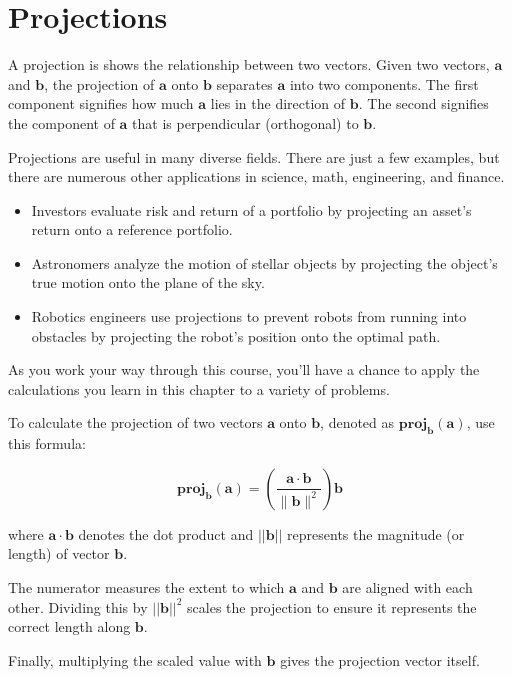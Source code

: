 \chapter{Projections}

A projection is shows the relationship between two vectors. Given two vectors, $\mathbf{a}$ and $\mathbf{b}$, the projection of $\mathbf{a}$ onto $\mathbf{b}$ separates $\mathbf{a}$ into two components. The first component signifies how much $\mathbf{a}$ lies in the direction of $\mathbf{b}$. The second signifies the component of $\mathbf{a}$ that is perpendicular (orthogonal) to $\mathbf{b}$. 

Projections are useful in many diverse fields. There are just a few examples, but there are numerous other applications in science, math, engineering, and finance.

\begin{itemize}
\item Investors evaluate risk and return of a portfolio by projecting an asset’s return onto a reference portfolio.
\item Astronomers analyze the motion of stellar objects by projecting the object’s true motion onto the plane of the sky.
\item Robotics engineers use projections to prevent robots from running into obstacles by projecting the robot’s position onto the optimal path.
\end{itemize}

As you work your way through this course, you'll have a chance to apply the calculations you learn in this chapter to a variety of problems.

To calculate the projection of two vectors
$\mathbf{a}$ onto $\mathbf{b}$, denoted as
$\mathbf{proj}_\mathbf{b}(\mathbf{a})$, use this formula:

$$\mathbf{proj}_\mathbf{b}(\mathbf{a}) = \left(\frac{{\mathbf{a} \cdot \mathbf{b}}}{{\|\mathbf{b}\|^2}}\right) \mathbf{b}$$

where $\mathbf{a} \cdot \mathbf{b}$ denotes the dot product and $||\mathbf{b}||$ represents the magnitude (or length) of vector $\mathbf{b}$.

The numerator measures the extent to
which $\mathbf{a}$ and $\mathbf{b}$ are aligned with each
other. Dividing this by $||\mathbf{b}||^2$ scales the projection to
ensure it represents the correct length along $\mathbf{b}$.

Finally, multiplying the scaled value with $\mathbf{b}$ gives the
projection vector itself.

